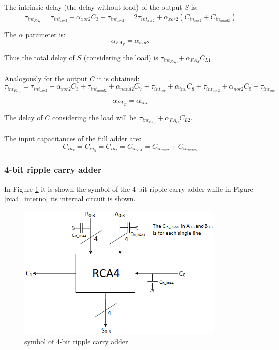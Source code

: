 The intrinsic delay (the delay without load) of the output $S$ is:
\begin{equation}
\tau_{int_{FA_{S}}} = \tau_{int_{xor2}}+\alpha_{xor2}C_3+\tau_{int_{xor2}} = 2\tau_{int_{xor2}}+\alpha_{xor2}(C_{in_{xor2}}+C_{in_{nand2}})
\end{equation}

The $\alpha$ parameter is:
\begin{equation}
\alpha_{FA_{S}}=\alpha_{xor2}
\end{equation}

Thus the total delay of $S$ (considering the load) is $\tau_{int_{FA_{S}}}+\alpha_{FA_{S}}C_{L1}$.\\\\
Analogously for the output $C$ it is obtained:
\begin{equation}
\tau_{int_{FA_{C}}} = \tau_{int_{xor2}}+\alpha_{xor2}C_3+\tau_{int_{nand2}}+\alpha_{nand2}C_7+\tau_{int_{inv}}+\alpha_{inv}C_8+\tau_{int_{nor2}}+\alpha_{nor2}C_9+\tau_{int_{inv}}
\end{equation}

\begin{equation}
\alpha_{FA_{C}}=\alpha_{inv}
\end{equation}

The delay of $C$ considering the load will be $\tau_{int_{FA_{C}}}+\alpha_{FA_{C}}C_{L2}$.\\\\

The input capacitances of the full adder are:
\begin{equation}
C_{in_{x}}=C_{in_{y}}=C_{in_{z}}=C_{in_{FA}}=C_{in_{xor2}}+C_{in_{nand2}}
\end{equation}





\subsubsection{4-bit ripple carry adder}
In Figure \ref{rca4_black_box} it is shown the symbol of the 4-bit ripple carry adder while in Figure \ref{rca4_interno} its internal circuit is shown.


\begin{figure}[H]
\centering
\includegraphics[width = 10cm]{pentium/rca4_black_box.png}
\caption{symbol of 4-bit ripple carry adder}
\label{rca4_black_box}
\end{figure}

